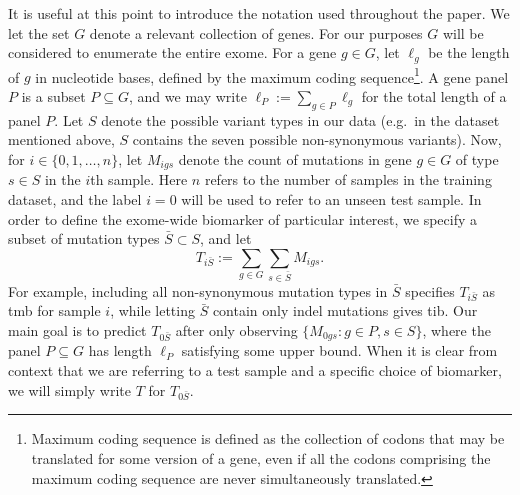 \documentclass[10pt,twoside,openright]{report}
\begin{document}
It is useful at this point to introduce the notation used throughout the paper. We let the set $G$ denote a relevant collection of genes. For our purposes $G$ will be considered to enumerate the entire exome. For a gene $g \in G$, let $\ell_g$ be the length of $g$ in nucleotide bases, defined by the maximum coding sequence\footnote{Maximum coding sequence is defined as the collection of codons that may be translated for some version of a gene, even if all the codons comprising the maximum coding sequence are never simultaneously translated.}. A gene panel $P$ is a subset $P \subseteq G$, and we may write $\ell_P := \sum_{g \in P} \ell_g$ for the total length of a panel $P$. Let $S$ denote the possible variant types in our data (e.g.~in the dataset mentioned above, $S$ contains the seven possible non-synonymous variants). Now, for $i \in \{0, 1, \ldots, n\}$, let $M_{igs}$ denote the count of mutations in gene $g \in G$ of type $s \in S$ in the $i$th sample. Here $n$ refers to the number of samples in the training dataset, and the label $i=0$ will be used to refer to an unseen test sample.  In order to define the exome-wide biomarker of particular interest, we specify a subset of mutation types $\bar{S} \subset S$, and let
\begin{equation}
T_{i\bar{S}} := \sum_{g \in G} \sum_{s \in \bar{S}} M_{igs}.
\label{eq:biomarker}
\end{equation}
% 
For example, including all non-synonymous mutation types in $\bar{S}$ specifies $T_{i\bar{S}}$ as \acrshort{tmb} for sample $i$, while letting $\bar{S}$ contain only indel mutations gives \acrshort{tib}. Our main goal is to predict $T_{0\bar{S}}$ after only observing $\{M_{0gs}: g \in P, s \in S\}$, where the panel $P \subseteq G$ has length $\ell_P$ satisfying some upper bound. When it is clear from context that we are referring to a test sample and a specific choice of biomarker, we will simply write $T$ for $T_{0\bar{S}}$.
\end{document}
